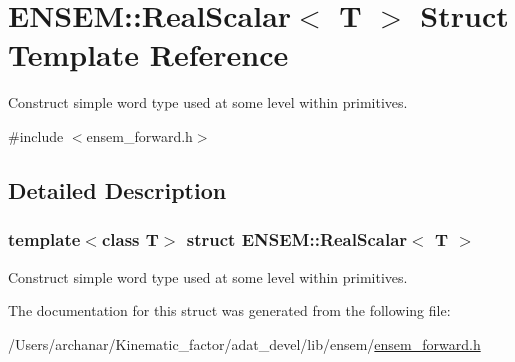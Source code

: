 \hypertarget{structENSEM_1_1RealScalar}{}\section{E\+N\+S\+EM\+:\+:Real\+Scalar$<$ T $>$ Struct Template Reference}
\label{structENSEM_1_1RealScalar}


Construct simple word type used at some level within primitives.  




{\ttfamily \#include $<$ensem\+\_\+forward.\+h$>$}



\subsection{Detailed Description}
\subsubsection*{template$<$class T$>$\newline
struct E\+N\+S\+E\+M\+::\+Real\+Scalar$<$ T $>$}

Construct simple word type used at some level within primitives. 

The documentation for this struct was generated from the following file\+:\begin{DoxyCompactItemize}
\item 
/\+Users/archanar/\+Kinematic\+\_\+factor/adat\+\_\+devel/lib/ensem/\mbox{\hyperlink{lib_2ensem_2ensem__forward_8h}{ensem\+\_\+forward.\+h}}\end{DoxyCompactItemize}
